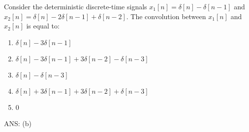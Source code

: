 \begin{q}{}
Consider the deterministic discrete-time signals $x_{1}[n] = \delta[n] - \delta[n-1]$ and $x_{2}[n] = \delta[n] - 2\delta[n-1] + \delta[n-2]$. The convolution between $x_{1}[n]$ and $x_{2}[n]$ is equal to:

\begin{enumerate}[label=(\alph*)]
    \item $\delta[n] - 3\delta[n-1]$
    \item $\delta[n] - 3\delta[n-1] + 3\delta[n-2] - \delta[n-3]$
    \item $\delta[n] - \delta[n-3]$
    \item $\delta[n] + 3\delta[n-1] + 3\delta[n-2] + \delta[n-3]$
    \item 0
\end{enumerate}

\begin{flushright}
\begin{blueenv}
    ANS: (b)
\end{blueenv}
\end{flushright}
\end{q}
